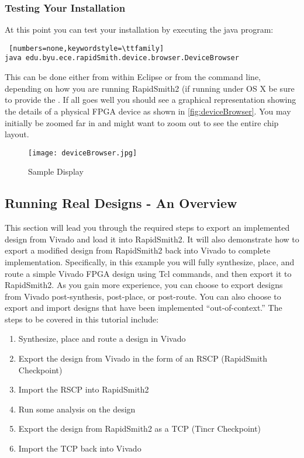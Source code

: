 \subsubsection{Testing Your Installation}
\noindent At this point you can test your installation by executing the java
 program: 

\begin{lstlisting} [numbers=none,keywordstyle=\ttfamily]
java edu.byu.ece.rapidSmith.device.browser.DeviceBrowser
\end{lstlisting} 

\noindent This can be done either from within Eclipse or from the command line,
depending on how you are running RapidSmith2 (if running under OS X be sure to provide the
. If all goes well you should see a
graphical representation showing the details of a physical FPGA device as shown
in \autoref{fig:deviceBrowser}.  You may initially be zoomed far in and might
want to zoom out to see the entire chip layout.

\begin{figure}[H]
\centering
\texttt{[image: deviceBrowser.jpg]}
\caption{ Sample Display}
\label{fig:deviceBrowser}
\end{figure}

\subsection{Running Real Designs - An Overview}
This section will lead you through the required steps to export an implemented 
design from Vivado and load it into RapidSmith2. It will also demonstrate how to
export a modified design from RapidSmith2 back into Vivado to complete
implementation. Specifically, in this example you will fully synthesize, place,
and route a simple Vivado FPGA design using Tcl commands, and then export it to
RapidSmith2. As you gain more experience, you can choose to export designs from
Vivado post-synthesis, post-place, or post-route. You can also choose to export
and import designs that have been implemented ``out-of-context.'' The
steps to be covered in this tutorial include:

\begin{enumerate}
  \item Synthesize, place and route a design in Vivado
  \item  Export the design from Vivado in the form of an RSCP (RapidSmith
  Checkpoint)
  \item Import the RSCP  into RapidSmith2
  \item Run some analysis on the design
  \item Export the design from RapidSmith2 as a TCP (Tincr Checkpoint)
  \item Import the TCP back into Vivado
\end{enumerate}

